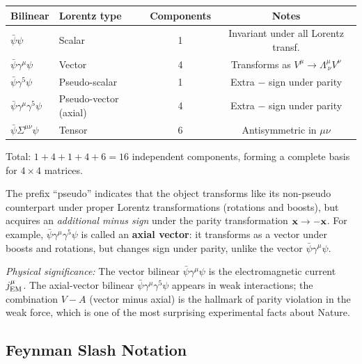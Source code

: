 \documentclass[../main.tex]{subfiles}
\begin{document}
\begin{center}
\renewcommand{\arraystretch}{1.4}
\begin{tabular}{llcc}
  \toprule
  Bilinear & Lorentz type & Components & Notes \\
  \midrule
  $\bar\psi\psi$ & Scalar & 1 & Invariant under all Lorentz transf. \\
  $\bar\psi\gamma^\mu\psi$ & Vector & 4 & Transforms as $V^\mu \to \Lambda^\mu_{\ \nu}V^\nu$ \\
  $\bar\psi\gamma^5\psi$ & Pseudo-scalar & 1 & Extra $-$ sign under parity \\
  $\bar\psi\gamma^\mu\gamma^5\psi$ & Pseudo-vector (axial) & 4 & Extra $-$ sign under parity \\
  $\bar\psi\Sigma^{\mu\nu}\psi$ & Tensor & 6 & Antisymmetric in $\mu\nu$ \\
  \bottomrule
\end{tabular}
\end{center}

Total: $1+4+1+4+6 = 16$ independent components, forming a complete basis for $4\times4$ matrices. \checkmark

\begin{remark}
The prefix ``pseudo'' indicates that the object transforms like its non-pseudo counterpart under proper Lorentz transformations (rotations and boosts), but acquires an \emph{additional minus sign} under the parity transformation $\mathbf{x}\to -\mathbf{x}$.  For example, $\bar\psi\gamma^\mu\gamma^5\psi$ is called an \textbf{axial vector}: it transforms as a vector under boosts and rotations, but changes sign under parity, unlike the vector $\bar\psi\gamma^\mu\psi$.
\end{remark}

\textit{Physical significance:} The vector bilinear $\bar\psi\gamma^\mu\psi$ is the electromagnetic current $j^\mu_{\rm EM}$.  The axial-vector bilinear $\bar\psi\gamma^\mu\gamma^5\psi$ appears in weak interactions; the combination $V - A$ (vector minus axial) is the hallmark of parity violation in the weak force, which is one of the most surprising experimental facts about Nature.

\subsection*{Feynman Slash Notation}
\end{document}
